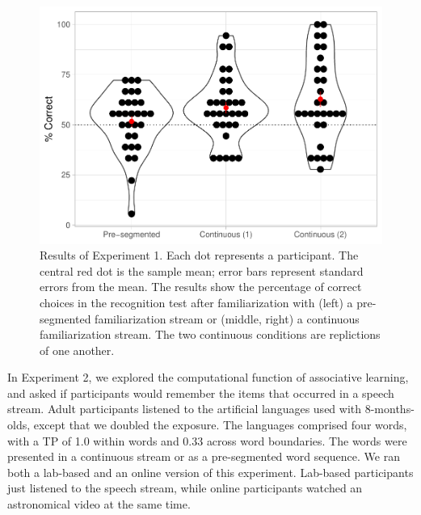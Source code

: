 \documentclass[]{article}
\begin{document}
\begin{figure}

{\centering \includegraphics[width=0.8\linewidth]{segmentation_recall_combined_files/figure-latex/stats-london-stats.3x.us.segm.cont.plot-1} 

}

\caption{Results of Experiment 1. Each dot represents a participant. The central red dot is the sample mean; error bars represent standard errors from the mean. The results show the percentage of correct choices in the recognition test after familiarization with (left) a pre-segmented familiarization stream or (middle, right) a continuous familiarization stream. The two continuous conditions are replictions of one another.}\label{fig:stats-london-stats.3x.us.segm.cont.plot}
\end{figure}



\clearpage


In Experiment 2, we explored the computational function of associative learning, and asked if participants would remember the items that occurred in a speech stream. Adult participants listened to the artificial languages \citet{Saffran-Science} used with 8-months-olds, except that we doubled the exposure. The languages comprised four words, with a TP of 1.0 within words and 0.33 across word boundaries. The words were presented in a continuous stream or as a pre-segmented word sequence. We ran both a lab-based and an online version of this experiment. Lab-based participants just listened to the speech stream, while online participants watched an astronomical video at the same time.
\end{document}
